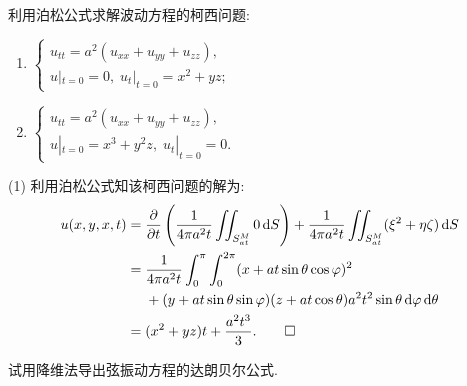 \begin{exercise}
  利用泊松公式求解波动方程的柯西问题:
  \begin{enumerate}[(1)]
    \item $\begin{cases}
            u_{tt} = a^2(u_{xx}+u_{yy}+u_{zz}), \\
            u|_{t=0}=0,\; u_t|_{t=0}=x^2+yz;
          \end{cases}$
    \item $\begin{cases}
            u_{tt} = a^2(u_{xx}+u_{yy}+u_{zz}), \\
            u|_{t=0}=x^3+y^2z,\; u_t|_{t=0}=0.
           \end{cases}$
  \end{enumerate}
\end{exercise}

\begin{solve}
  (1) 利用泊松公式知该柯西问题的解为:
  \begin{align*}
    u(x,y,x,t)
    ={} & \frac{\partial}{\partial t}\left(\frac{1}{4\pi a^2t}\iint_{S_{at}^M}0\mathop{}\!\mathrm{d} S\right)
          + \frac{1}{4\pi a^2t}\iint_{S_{at}^M}(\xi^2+\eta\zeta)\mathop{}\!\mathrm{d} S \\
    ={} & \frac{1}{4\pi a^2t}\int_0^{\pi}\int_0^{2\pi}(x+at\sin\theta\cos\varphi)^2 \\
        & + (y+at\sin\theta\sin\varphi)(z+at\cos\theta)
          a^2t^2\sin\theta\mathop{}\!\mathrm{d}\varphi\mathop{}\!\mathrm{d}\theta \\
    ={} & (x^2+	yz)t+\frac{a^2t^3}{3}. \qedhere
  \end{align*}
\end{solve}


\begin{exercise}
  试用降维法导出弦振动方程的达朗贝尔公式.
\end{exercise}

